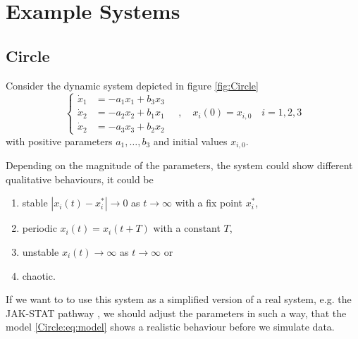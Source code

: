 \section{Example Systems}

	\subsection*{Circle}
	Consider the dynamic system depicted in figure \ref{fig:Circle}
	\begin{equation}\left\{ \begin{aligned}
	\dot{x}_1 &= -a_1 x_1 + b_3 x_3 \\ 
	\dot{x}_2 &= -a_2 x_2 + b_1 x_1 \\ 
	\dot{x}_2 &= -a_3 x_3 + b_2 x_2
	\end{aligned} \right.
	\quad , \quad x_i(0) = x_{i,0} \quad i=1,2,3	
	\label{Circle:eq:model}\end{equation}
	with positive parameters $a_1,\ldots,b_3$ and initial values $x_{i,0}$.
	
	Depending on the magnitude of the parameters, the system could show different 
	qualitative behaviours, it could be
	\begin{enumerate}
	\item stable $|x_i(t) - x_i^*| \to 0 $ as $t\to \infty$ with a fix point $x_i^*$,
	\item periodic $x_i(t)= x_i(t+T)$ with a constant $T$,
	\item unstable $x_i(t) \to \infty$ as $t\to\infty$ or
	\item chaotic. 
	\end{enumerate}
	If we want to to use this system as a simplified version of a real system, e.g. 
	the JAK-STAT pathway \cite{DEN}, we should adjust the parameters in such a way, that 
	the model \eqref{Circle:eq:model} shows a realistic behaviour before we simulate 
	data.\\
	
